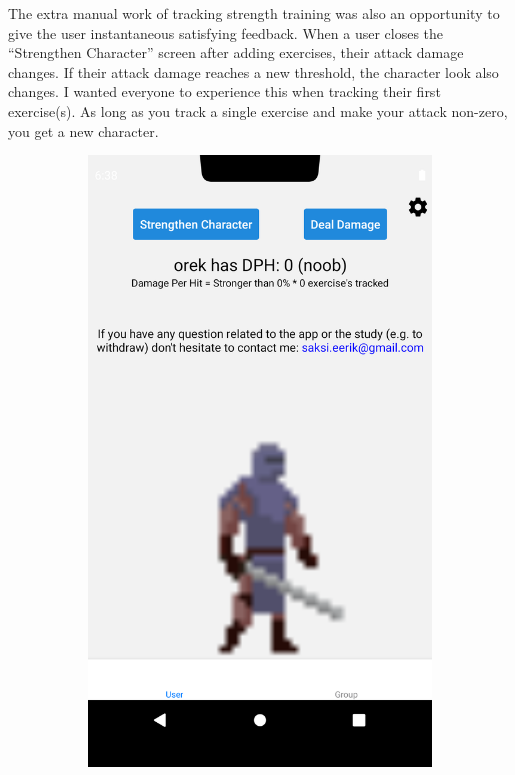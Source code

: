 \documentclass{l4proj}
\begin{document}
\newpage

The extra manual work of tracking strength training was also an opportunity to give the user instantaneous satisfying feedback. When a user closes the ``Strengthen Character'' screen after adding exercises, their attack damage changes. If their attack damage reaches a new threshold, the character look also changes. I wanted everyone to experience this when tracking their first exercise(s). As long as you track a single exercise and make your attack non-zero, you get a new character.

\begin{figure}[H]
    \begin{subfigure}{0.45\textwidth}
      \includegraphics[width=\textwidth]{noob_user_page.png}    

\end{subfigure}
\end{figure}
\end{document}
